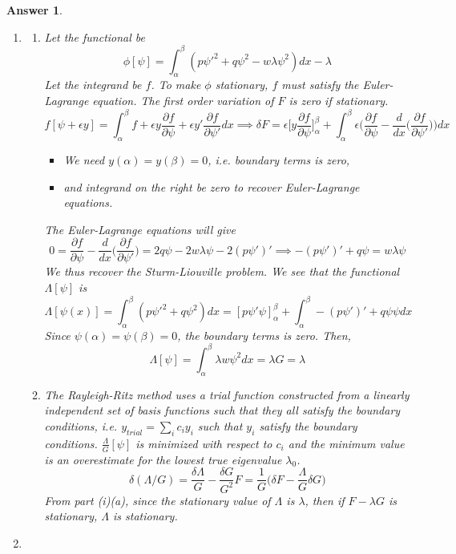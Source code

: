 \documentclass[a4paper]{article}
\newtheorem{ans}{Answer}[section]
\theoremstyle{new}
\begin{document}
\begin{ans}\leavevmode
\begin{enumerate}[label=(\roman*)]
\item 
\begin{enumerate}[label=(\alph*)]
\item Let the functional be 
$$\phi[\psi]=\int_\alpha^\beta(p\psi'^2+q\psi^2-w\lambda\psi^2)dx-\lambda$$
Let the integrand be $f$. To make $\phi$ stationary, $f$ must satisfy the Euler-Lagrange equation. The first order variation of $F$ is zero if stationary.
$$f[\psi+\epsilon y]=\int_\alpha^\beta f+\epsilon y\frac{\partial f}{\partial\psi}+\epsilon y'\frac{\partial f}{\partial\psi'}dx\implies\delta F=\epsilon\bigg[y\frac{\partial f}{\partial\psi}\bigg]_\alpha^\beta+\int_\alpha^\beta\epsilon\bigg(\frac{\partial f}{\partial\psi}-\frac{d}{dx}\bigg(\frac{\partial f}{\partial\psi'}\bigg)\bigg)dx$$
\begin{itemize}
    \item We need $y(\alpha)=y(\beta)=0$, i.e. boundary terms is zero,
    \item and integrand on the right be zero to recover Euler-Lagrange equations.
\end{itemize}
The Euler-Lagrange equations will give
$$0=\frac{\partial f}{\partial\psi}-\frac{d}{dx}\bigg(\frac{\partial f}{\partial\psi'}\bigg)=2q\psi-2w\lambda\psi-2(p\psi')'\implies -(p\psi')'+q\psi=w\lambda\psi$$
We thus recover the Sturm-Liouville problem. We see that the functional $\Lambda[\psi]$ is
$$\Lambda[\psi(x)]=\int_\alpha^\beta(p\psi'^2+q\psi^2)dx=[p\psi'\psi]_\alpha^\beta+\int_\alpha^\beta-(p\psi')'+q\psi\psi dx$$
Since $\psi(\alpha)=\psi(\beta)=0$, the boundary terms is zero. Then, $$\Lambda[\psi]=\int_\alpha^\beta\lambda w\psi^2dx=\lambda G=\lambda$$
\item The Rayleigh-Ritz method uses a trial function constructed from a linearly independent set of basis functions such that they all satisfy the boundary conditions, i.e. $y_{trial}=\sum_ic_iy_i$ such that $y_i$ satisfy the boundary conditions. $\frac{\Lambda}{G}[\psi]$ is minimized with respect to $c_i$ and the minimum value is an overestimate for the lowest true eigenvalue $\lambda_0$.
$$\delta(\Lambda/G)=\frac{\delta\Lambda}{G}-\frac{\delta G}{G^2}F=\frac{1}{G}\bigg(\delta F-\frac{\Lambda}{G}\delta G\bigg)$$
From part (i)(a), since the stationary value of $\Lambda$ is $\lambda$, then if $F-\lambda G$ is stationary, $\Lambda$ is stationary.
\end{enumerate}
\item

\end{enumerate}
\end{ans}
\end{document}
